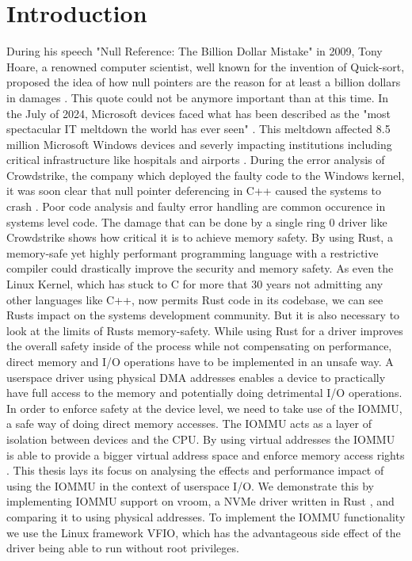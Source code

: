 \chapter{Introduction}\label{c:introduction}

During his speech "Null Reference: The Billion Dollar Mistake" in 2009, Tony Hoare, a renowned computer scientist, well known for the invention of Quick-sort, proposed the idea of how null pointers are the reason for at least a billion dollars in damages \cite{billiondollarmistake}. This quote could not be anymore important than at this time. In the July of 2024, Microsoft devices faced what has been described as the "most spectacular IT meltdown the world has ever seen" \cite{bloombergmeltdown}. This meltdown affected 8.5 million Microsoft Windows devices and severly impacting institutions including critical infrastructure like hospitals and airports \cite{bloomberg8milliondevices}. During the error analysis of Crowdstrike, the company which deployed the faulty code to the Windows kernel, it was soon clear that null pointer deferencing in C++ caused the systems to crash \cite{heisenullpointer}. Poor code analysis and faulty error handling are common occurence in systems level code. The damage that can be done by a single ring 0 driver like Crowdstrike shows how critical it is to achieve memory safety. By using Rust, a memory-safe yet highly performant programming language with a restrictive compiler could drastically improve the security and memory safety. As even the Linux Kernel, which has stuck to C for more that 30 years not admitting any other languages like C++, now permits Rust code in its codebase, we can see Rusts impact on the systems development community.
But it is also necessary to look at the limits of Rusts memory-safety. While using Rust for a driver improves the overall safety inside of the process while not compensating on performance, direct memory and I/O operations have to be implemented in an unsafe way. A userspace driver using physical DMA addresses enables a device to practically have full access to the memory and potentially doing detrimental I/O operations.
In order to enforce safety at the device level, we need to take use of the IOMMU, a safe way of doing direct memory accesses. The IOMMU acts as a layer of isolation between devices and the CPU. By using virtual addresses the IOMMU is able to provide a bigger virtual address space and enforce memory access rights \cite{OLS2007}.
This thesis lays its focus on analysing the effects and performance impact of using the IOMMU in the context of userspace I/O.
We demonstrate this by implementing IOMMU support on vroom, a NVMe driver written in Rust \cite{vroom}, and comparing it to using physical addresses. To implement the IOMMU functionality we use the Linux framework VFIO, which has the advantageous side effect of the driver being able to run without root privileges.
